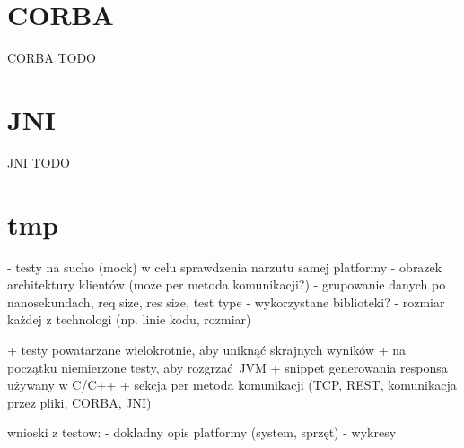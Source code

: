 \section{CORBA}

CORBA TODO


\section{JNI}

JNI TODO


\section{tmp}

- testy na sucho (mock) w celu sprawdzenia narzutu samej platformy
- obrazek architektury klientów (może per metoda komunikacji?)
- grupowanie danych po nanosekundach, req size, res size, test type
- wykorzystane biblioteki?
- rozmiar każdej z technologi (np. linie kodu, rozmiar)

+ testy powatarzane wielokrotnie, aby uniknąć skrajnych wyników
+ na początku niemierzone testy, aby rozgrzać JVM
+ snippet generowania responsa używany w C/C++
+ sekcja per metoda komunikacji (TCP, REST, komunikacja przez pliki, CORBA, JNI)

wnioski z testow:
- dokladny opis platformy (system, sprzęt)
- wykresy